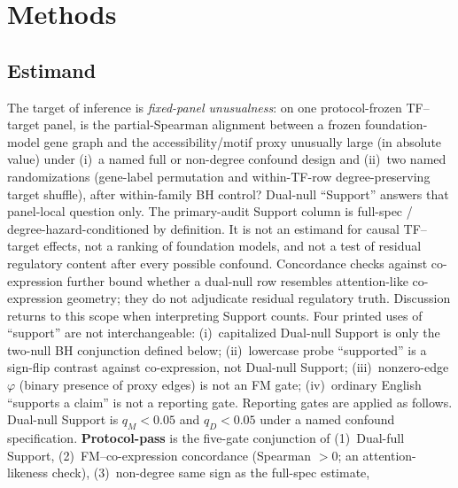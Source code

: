 \documentclass[fleqn,10pt,lineno]{wlpeerj}
\begin{document}
\begin{table}[H]\centering

\caption{Protocol axes versus related evaluation resources. Entries are qualitative design
features, not performance ranks. scReg-Eval is a fixed-panel audit capsule; GeneRNIB and BioLLM-style
suites score broader tasks against often expression-linked references.}\label{tab:related}
\end{table}

\section{Methods}
\subsection{Estimand}\label{sec:estimand}
The target of inference is \emph{fixed-panel unusualness}: on one protocol-frozen TF--target panel,
is the partial-Spearman alignment between a frozen foundation-model gene graph and the
accessibility/motif proxy unusually large (in absolute value) under (i)~a named full or non-degree
confound design and (ii)~two named randomizations (gene-label permutation and within-TF-row
degree-preserving target shuffle), after within-family BH control? Dual-null ``Support'' answers
that panel-local question only. The primary-audit Support column is full-spec /
degree-hazard-conditioned by definition. It is not an estimand for causal TF--target effects, not a ranking
of foundation models, and not a test of residual regulatory content after every possible
confound. Concordance checks against co-expression further bound whether a dual-null row resembles
attention-like co-expression geometry; they do not adjudicate residual regulatory truth. Discussion
returns to this scope when interpreting Support counts.
Four printed uses of ``support'' are not interchangeable: (i)~capitalized Dual-null Support is only
the two-null BH conjunction defined below; (ii)~lowercase probe ``supported'' is a sign-flip contrast
against co-expression, not Dual-null Support; (iii)~nonzero-edge $\varphi$ (binary presence of
proxy edges) is not an FM gate; (iv)~ordinary English ``supports a claim'' is not a reporting gate.
Reporting gates are applied as follows. Dual-null Support is
$q_M<0.05$ and $q_D<0.05$ under a named confound specification.
\textbf{Protocol-pass} is the five-gate conjunction of (1)~Dual-full Support,
(2)~FM--co-expression concordance (Spearman $>0$; an attention-likeness check),
(3)~non-degree same sign as the full-spec estimate,
\end{document}
